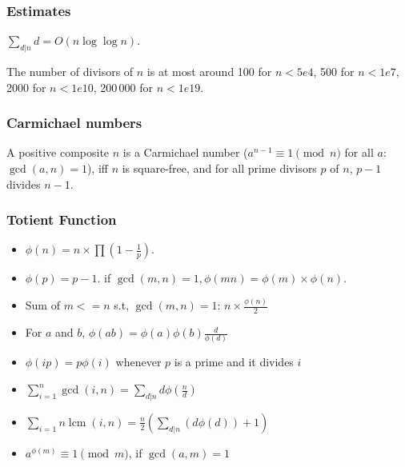 \begin{small}
\subsubsection{Estimates}
  $\sum_{d|n} d = O(n \log \log n)$.

  The number of divisors of $n$ is at most around 100 for $n < 5e4$, 500 for $n < 1e7$, 2000 for $n < 1e10$, 200\,000 for $n < 1e19$.

\subsubsection{Carmichael numbers}
A positive composite $n$ is a Carmichael number
($a^{n-1} \equiv 1 \pmod{n}$ for all $a$: $\gcd(a,n)=1$),
iff $n$ is square-free, and for all prime divisors $p$ of $n$, $p-1$ divides $n-1$.

\subsubsection{Totient Function}
\begin{itemize}[noitemsep]
  \itemsep0em
  \item $\phi(n) = n \times \prod \left(1 - \frac{1}{p} \right)$.
  \item $\phi(p) = p - 1$. if $\operatorname{gcd}(m, n) = 1, \phi(mn) = \phi(m) \times \phi(n)$.
  \item Sum of $m <= n$ s.t, $\operatorname{gcd}(m, n) = 1$: $n \times \frac{\phi(n)}{2}$
  \item For \( a \) and \( b \), \( \phi(ab) = \phi(a)\phi(b)\frac{d}{\phi(d)} \)
  \item \( \phi (ip) = p \phi(i) \) whenever \( p \) is a prime and it divides \( i \)
  \item \( \sum_{i=1}^n \operatorname{gcd}(i, n) = \sum_{d|n} d \phi(\frac{n}{d}) \)
  \item \( \sum_{i=1}{n} \operatorname{lcm}(i, n) = \frac{n}{2}(\sum_{d|n}(d \phi(d))+1) \)
  \item $a^{\phi(m)} \equiv 1 \pmod{m}$, if $\operatorname{gcd}(a, m) = 1$
\end{itemize}


\end{small}
